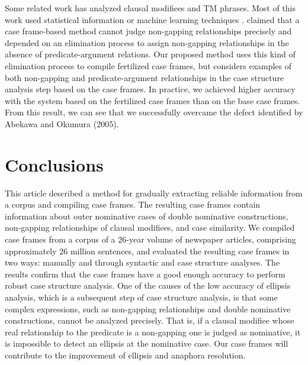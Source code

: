 \documentclass[english]{jnlp_1.4_rep}
\begin{document}
Some related work has analyzed clausal modifiees and TM
phrases. Most of this work used statistical information or machine learning
techniques \cite{Baldwin1999,Torisawa2001,Murata2005,Abekawa2005}.
 claimed that a case frame-based method cannot judge non-gapping
relationships precisely and depended on an
elimination process to assign non-gapping relationships in the absence of 
predicate-argument relations. Our proposed method uses this
kind of elimination process to compile fertilized case frames, but
considers examples of both non-gapping and predicate-argument relationships in the case structure analysis step based on
the case frames. In practice, we achieved higher accuracy with the
system based on the fertilized case frames than on the base case
frames. From this result, we can see that we successfully overcame
the defect identified by Abekawa and Okumura (2005).


\section{Conclusions}

This article described a method for gradually extracting reliable
information from a corpus and compiling case frames. The resulting case
frames contain information about outer nominative cases of double
nominative constructions, non-gapping relationships of clausal modifiees, and
case similarity. We compiled case frames from a corpus of a 26-year volume
of newspaper articles, comprising approximately 26 million sentences,
and evaluated the resulting case frames in two ways: manually and through
syntactic and case structure analyses. The results confirm that the case
frames have a good enough accuracy to perform robust case structure
analysis. One of the causes of the low accuracy of ellipsis analysis,
which is a subsequent step of case structure analysis, is that some
complex expressions, such as non-gapping relationships and double nominative
constructions, cannot be analyzed precisely. That is, if a clausal
modifiee whose real relationship to the predicate is a non-gapping one is judged as
nominative, it is impossible to detect an ellipsis at the nominative case.
Our case frames will contribute to the improvement of ellipsis and
anaphora resolution.
\end{document}
